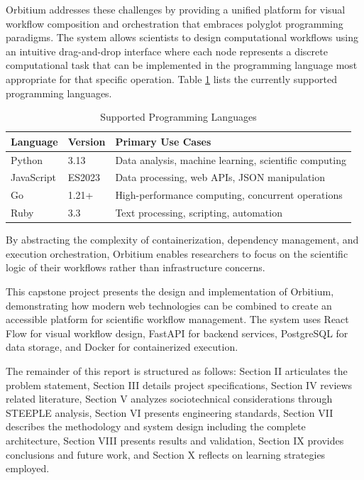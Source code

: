 \documentclass[12pt]{article}
\begin{document}
Orbitium addresses these challenges by providing a unified platform for visual workflow composition and orchestration that embraces polyglot programming paradigms. The system allows scientists to design computational workflows using an intuitive drag-and-drop interface where each node represents a discrete computational task that can be implemented in the programming language most appropriate for that specific operation. Table \ref{tab:languages} lists the currently supported programming languages.

\begin{table}[h]
\centering
\caption{Supported Programming Languages}
\label{tab:languages}
\begin{tabular}{|l|l|p{6cm}|}
\hline
\textbf{Language} & \textbf{Version} & \textbf{Primary Use Cases} \\
\hline
Python & 3.13 & Data analysis, machine learning, scientific computing \\
JavaScript & ES2023 & Data processing, web APIs, JSON manipulation \\
Go & 1.21+ & High-performance computing, concurrent operations \\
Ruby & 3.3 & Text processing, scripting, automation \\
\hline
\end{tabular}
\end{table}

By abstracting the complexity of containerization, dependency management, and execution orchestration, Orbitium enables researchers to focus on the scientific logic of their workflows rather than infrastructure concerns.

This capstone project presents the design and implementation of Orbitium, demonstrating how modern web technologies can be combined to create an accessible platform for scientific workflow management. The system uses React Flow for visual workflow design, FastAPI for backend services, PostgreSQL for data storage, and Docker for containerized execution.

The remainder of this report is structured as follows: Section II articulates the problem statement, Section III details project specifications, Section IV reviews related literature, Section V analyzes sociotechnical considerations through STEEPLE analysis, Section VI presents engineering standards, Section VII describes the methodology and system design including the complete architecture, Section VIII presents results and validation, Section IX provides conclusions and future work, and Section X reflects on learning strategies employed.
\end{document}
